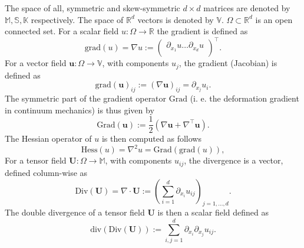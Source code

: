 The space of all, symmetric and skew-symmetric $d\times d$ matrices are denoted by $\mathbb{M}, \mathbb{S}, \mathbb{K}$ respectively. The space of $\mathbb{R}^d$ vectors is denoted by $\mathbb{V}$. $\Omega \subset \mathbb{R}^d$ is an open connected set. For a scalar field $u: \Omega \rightarrow \mathbb{R}$ the gradient is defined as 
\begin{equation*}
\mathrm{grad}(u) =  \nabla u := \begin{pmatrix}
\partial_{x_1} u \dots \partial_{x_d} u \\
\end{pmatrix}^\top.
\end{equation*}
For a vector field $\bm{u}: \Omega \rightarrow \mathbb{V}$, with components $u_j$, the gradient (Jacobian) is defined as
\begin{equation*}
\mathrm{grad}(\bm{u})_{i j}:= (\nabla \bm{u})_{ij} = \partial_{x_j} u_i.
\end{equation*}
The symmetric part of the gradient operator $\mathrm{Grad}$ (i. e. the deformation gradient in continuum mechanics) is thus given by
\begin{equation*}
\mathrm{Grad}(\bm{u}) := \frac{1}{2} \left(\nabla \bm{u} + \nabla^\top \bm{u} \right).
\end{equation*}
The Hessian operator of $u$ is then computed as follows
\begin{equation*}
\mathrm{Hess}(u) = \nabla^2 u = \mathrm{Grad}(\mathrm{grad}(u)),
\end{equation*}
For a tensor field $\bm{U}: \Omega \rightarrow \mathbb{M}$, with components $u_{ij}$, the divergence is a vector, defined column-wise as
\begin{equation*}
\mathrm{Div}(\bm U) = \nabla \cdot \bm{U} := \left( \sum_{i = 1}^d \partial_{x_i} u_{ij} \right)_{j = 1, \dots, d}.
\end{equation*}
The double divergence of a tensor field $\bm{U}$ is then a scalar field defined as
\begin{equation*}
\mathrm{div}(\mathrm{Div}(\bm U)):= \sum_{i, j = 1}^d \partial_{x_i} \partial_{x_j} u_{ij}.
\end{equation*}

